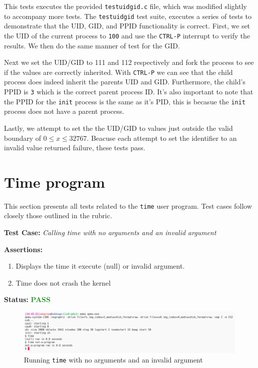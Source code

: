 \documentclass[11pt,letterpaper]{report}
\newcommand{\code}[1]{\colorbox{codegray}{\texttt{#1}}}
\begin{document}
{  This tests executes the provided \code{testuidgid.c} file, which was modified slightly 
  to accompany more tests. The \code{testuidgid} test suite, executes a series of tests to demonstrate that the
  UID, GID, and PPID functionality is correct. First, we set the UID of the current process
  to \code{100} and use the \code{CTRL-P} interrupt to verify the results. We then do the same
  manner of test for the GID. 

  Next we set the UID/GID to 111 and 112 respectively and fork the
  process to see if the values are correctly inherited. With \code{CTRL-P} we can see that the
  child process does indeed inherit the parents UID and GID. Furthermore, the child's PPID is 
  \code{3} which is the correct parent process ID. It's also important to note that the 
  PPID for the \code{init} process is the same as it's PID, this is becasue the \code{init}
  process does not have a parent process.

  Lastly, we attempt to set the the UID/GID to values just outside the valid boundary of 
  $0 \leq x \leq 32767$. Beacuse each attempt to set the identifier to an invalid value 
  returned failure, these tests pass. 

  \section*{Time program}
  This section presents all tests related to the \code{time} user program.
  Test cases follow closely those outlined in the rubric. \hfill \break
  
  \noindent\textbf{Test Case:} \emph{Calling time with no arguments and an invalid argument}
  
  \noindent\textbf{Assertions:}
  \begin{enumerate}[]
  \item Displays the time it execute (null) or invalid argument. 
  \item Time does not crash the kernel
  \end{enumerate}  
  
  \noindent\textbf{Status:} \textcolor{ForestGreen}{\textbf{PASS}}
  
  \begin{figure}[h!]
	\centering
	\includegraphics[width=1\linewidth]{time1.png}
	\caption[img]{Running \code{time} with no arguments and an invalid argument}
	\label{fig:P1compileP0-1}
  \end{figure}

}
\end{document}
